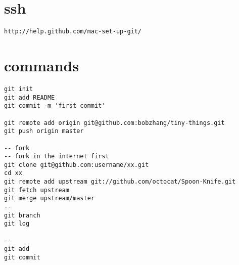 \documentclass[12pt,a4paper]{article}
\begin{document}
\setcounter{tocdepth}{3}
\tableofcontents
\vspace*{1cm}

\section{ssh}
\label{sec:ssh}
\begin{verbatim}
http://help.github.com/mac-set-up-git/
\end{verbatim}

\section{commands}
\begin{verbatim}
git init
git add README
git commit -m 'first commit'

git remote add origin git@github.com:bobzhang/tiny-things.git
git push origin master

-- fork
-- fork in the internet first 
git clone git@github.com:username/xx.git
cd xx
git remote add upstream git://github.com/octocat/Spoon-Knife.git
git fetch upstream
git merge upstream/master 
--
git branch
git log

-- 
git add
git commit 
\end{verbatim}
\end{document}
